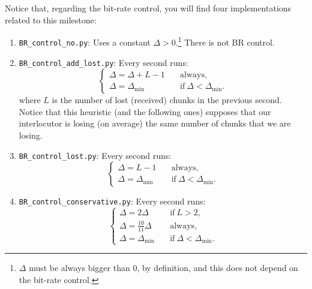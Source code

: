 Notice that, regarding the bit-rate control, you will find four
implementations related to this milestone:
\begin{enumerate}
\item \verb|BR_control_no.py|: Uses a constant
  $\Delta>0$.\footnote{$\Delta$ must be always bigger than $0$, by
definition, and this does not depend on the bit-rate control.} There
  is not BR control.
\item \verb|BR_control_add_lost.py|: Every second runs:
  \begin{equation}
    \left\{
    \begin{array}{ll}
      \Delta = \Delta + L - 1 & \quad\text{always}, \\
      \Delta = \Delta_{\text{min}} & \quad\text{if}~\Delta < \Delta_{\text{min}}.                                 
    \end{array}
    \right.
  \end{equation}
  where $L$ is the number of lost (received) chunks in the previous
  second. Notice that this heuristic (and the following ones) supposes
  that our interlocutor is losing (on average) the same number of
  chunks that we are losing.
\item \verb|BR_control_lost.py|: Every second runs:
  \begin{equation}
    \left\{
    \begin{array}{ll}
      \Delta = L - 1 & \quad\text{always}, \\
      \Delta = \Delta_{\text{min}} & \quad\text{if}~\Delta < \Delta_{\text{min}}.
    \end{array}
    \right.
  \end{equation}
\item \verb|BR_control_conservative.py|: Every second runs:
  \begin{equation}
    \left\{
    \begin{array}{ll}
      \Delta = 2\Delta & \quad\text{if}~L>2, \\
      \Delta = \frac{10}{11}\Delta & \quad\text{always}, \\
      \Delta = \Delta_{\text{min}} & \quad\text{if}~\Delta < \Delta_{\text{min}}.
    \end{array}
    \right.
  \end{equation}
\end{enumerate}

